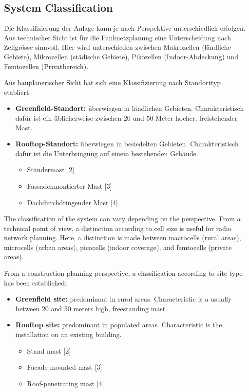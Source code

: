 \subsection{System Classification}
\begin{German}
    Die Klassifizierung der Anlage kann je nach Perspektive unterschiedlich erfolgen. Aus technischer Sicht ist für die Funknetzplanung eine Unterscheidung nach Zellgrösse sinnvoll. Hier wird unterschieden zwischen Makrozellen (ländliche Gebiete), Mikrozellen (städische Gebiete), Pikozellen (Indoor-Abdeckung) und Femtozellen (Privatbereich). \cite{bundesratNachhaltigesMobilfunknetzBericht2022}

    Aus bauplanerischer Sicht hat sich eine Klassifizierung nach Standorttyp etabliert:

    \begin{itemize}
        \item \textbf{Greenfield-Standort:} überwiegen in ländlichen Gebieten. Charakteristisch dafür ist ein üblicherweise zwischen 20 und 50 Meter hocher, freistehender Mast.
        \item \textbf{Rooftop-Standort:} überwiegen in besiedelten Gebieten. Charakteristisch dafür ist die Unterbringung auf einem bestehenden Gebäude.
        \begin{itemize}
            \item Ständermast [2]
            \item Fassadenmontierter Mast [3]
            \item Dachdurchdringender Mast [4]
        \end{itemize}
    \end{itemize}
\end{German}

\begin{English}
    The classification of the system can vary depending on the perspective. From a technical point of view, a distinction according to cell size is useful for radio network planning. Here, a distinction is made between macrocells (rural areas), microcells (urban areas), picocells (indoor coverage), and femtocells (private areas). \cite{bundesratNachhaltigesMobilfunknetzBericht2022}

    From a construction planning perspective, a classification according to site type has been established: 

    \begin{itemize}
        \item \textbf{Greenfield site:} predominant in rural areas. Characteristic is a usually between 20 and 50 meters high, freestanding mast.
        \item \textbf{Rooftop site:} predominant in populated areas. Characteristic is the installation on an existing building.
        \begin{itemize}
            \item Stand mast [2]
            \item Facade-mounted mast [3]
            \item Roof-penetrating mast [4]
        \end{itemize}
    \end{itemize}
\end{English}

